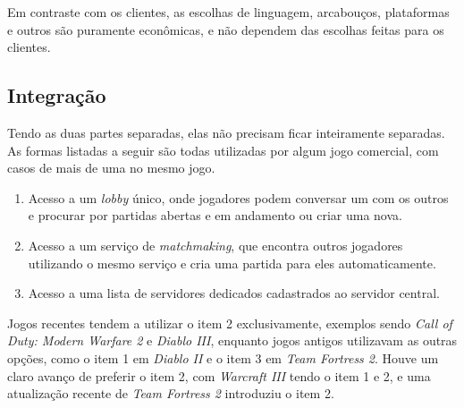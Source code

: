       Em contraste com os clientes, as escolhas de linguagem, arcabouços, plataformas e outros são
      puramente econômicas, e não dependem das escolhas feitas para os clientes.
      
  \subsection{Integração}
    Tendo as duas partes separadas, elas não precisam ficar inteiramente separadas. As formas
    listadas a seguir são todas utilizadas por algum jogo comercial, com casos de mais de uma no
    mesmo jogo.
    
    \begin{enumerate}
      \item Acesso a um \textit{lobby} único, onde jogadores podem conversar um com os outros e
        procurar por partidas abertas e em andamento ou criar uma nova.
      \item Acesso a um serviço de \textit{matchmaking}, que encontra outros jogadores utilizando
        o mesmo serviço e cria uma partida para eles automaticamente.
      \item Acesso a uma lista de servidores dedicados cadastrados ao servidor central.
    \end{enumerate}
    
    Jogos recentes tendem a utilizar o item 2 exclusivamente, exemplos sendo \textit{Call of Duty:
    Modern Warfare 2\footnotemark{}} e \textit{Diablo III\footnotemark{}}, enquanto jogos antigos
    utilizavam as outras opções, como o item 1 em \textit{Diablo II\footnotemark{}} e o item 3 em
    \textit{Team Fortress 2\footnotemark{}}. Houve um claro avanço de preferir o item 2, com 
    \textit{Warcraft III\footnotemark{}} tendo o item 1 e 2, e uma atualização recente de 
    \textit{Team Fortress 2} introduziu o item 2.
    
    \addtocounter{footnote}{-5}

    
